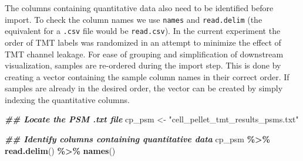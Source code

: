 \documentclass[9pt,a4paper,]{extarticle}
\newenvironment{Shaded}{\begin{snugshade}}{\end{snugshade}}
\newcommand{\DocumentationTok}[1]{\textcolor[rgb]{0.56,0.35,0.01}{\textbf{\textit{#1}}}}
\newcommand{\FunctionTok}[1]{\textcolor[rgb]{0.13,0.29,0.53}{\textbf{#1}}}
\newcommand{\NormalTok}[1]{#1}
\newcommand{\OtherTok}[1]{\textcolor[rgb]{0.56,0.35,0.01}{#1}}
\newcommand{\SpecialCharTok}[1]{\textcolor[rgb]{0.81,0.36,0.00}{\textbf{#1}}}
\newcommand{\StringTok}[1]{\textcolor[rgb]{0.31,0.60,0.02}{#1}}
\begin{document}
The columns containing quantitative data also need to be identified before
import. To check the column names we use \texttt{names} and \texttt{read.delim} (the equivalent
for a \texttt{.csv} file would be \texttt{read.csv}). In the current experiment the order of
TMT labels was randomized in an attempt to minimize the effect of TMT channel
leakage. For ease of grouping and simplification of downstream visualization,
samples are re-ordered during the import step. This is done by creating a vector
containing the sample column names in their correct order. If samples are
already in the desired order, the vector can be created by simply indexing the
quantitative columns.

\begin{Shaded}
\begin{Highlighting}[]
\DocumentationTok{\#\# Locate the PSM .txt file}
\NormalTok{cp\_psm }\OtherTok{\textless{}{-}} \StringTok{"cell\_pellet\_tmt\_results\_psms.txt"}

\DocumentationTok{\#\# Identify columns containing quantitative data}
\NormalTok{cp\_psm }\SpecialCharTok{\%\textgreater{}\%}
  \FunctionTok{read.delim}\NormalTok{() }\SpecialCharTok{\%\textgreater{}\%}
  \FunctionTok{names}\NormalTok{()}
\end{Highlighting}
\end{Shaded}
\end{document}
